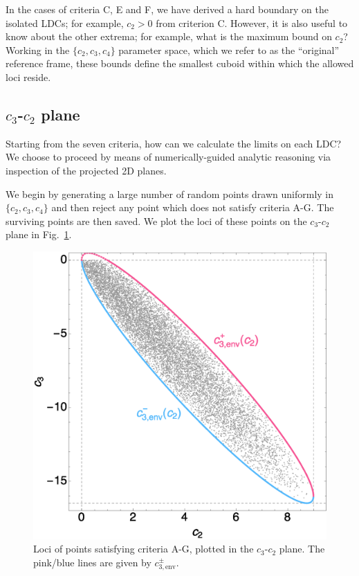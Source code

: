 
In the cases of criteria C, E and F, we have derived a hard boundary on the 
isolated LDCs; for example, $c_2>0$ from criterion C. However, it is also useful 
to know about the other extrema; for example, what is the maximum bound on 
$c_2$? Working in the $\{c_2,c_3,c_4\}$ parameter space, which we refer 
to as the ``original'' reference frame, these bounds define the smallest cuboid 
within which the allowed loci reside.

\subsection{$c_3$-$c_2$ plane}
\label{sub:c3c2plane}

Starting from the seven criteria, how can we calculate the limits on each LDC?
We choose to proceed by means of numerically-guided analytic reasoning via
inspection of the projected 2D planes. 

We begin by generating a large number of random points drawn uniformly in 
$\{c_2,c_3,c_4\}$ and then reject any point which does not satisfy criteria A-G. 
The surviving points are then saved. We plot the loci of these points on the 
$c_3$-$c_2$ plane in Fig.~\ref{fig:c3c2surface}.

\begin{figure}
\includegraphics[width=\columnwidth]{c3c2surface.eps}
\caption{
Loci of points satisfying criteria A-G, plotted in the $c_3$-$c_2$ plane.
The pink/blue lines are given by $c_{3,\mathrm{env}}^{\pm}$.
}
\label{fig:c3c2surface}
\end{figure}

